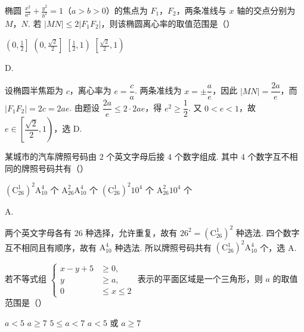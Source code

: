 \begin{problem}
椭圆 \(\frac{x^2}{a^2} + \frac{y^2}{b^2} = 1\)（\(a > b > 0\)）的焦点为 \(F_1\)，\(F_2\)，两条准线与 \(x\) 轴的交点分别为 \(M\)，\(N\). 若 \(|MN| \leqslant 2|F_1F_2|\)，则该椭圆离心率的取值范围是（\quad）

\choices
    {\(\left(0, \frac{1}{2}\right]\)}
    {\(\left(0, \frac{\sqrt{2}}{2}\right]\)}
    {\(\left[\frac{1}{2}, 1\right)\)}
    {\(\left[\frac{\sqrt{2}}{2}, 1\right)\)}
\end{problem}

\begin{answer}
D.
\end{answer}

\begin{solution}
设椭圆半焦距为 \(c\)，离心率为 \(e=\dfrac ca\). 两条准线为 \(x=\pm\dfrac{a}{e}\)，因此
\(|MN|=\dfrac{2a}{e}\)，而 \(|F_1F_2|=2c=2ae\). 由题设
\(\dfrac{2a}{e}\leqslant2\cdot2ae\)，得 \(e^2\geqslant\dfrac12\). 又 \(0<e<1\)，故 \(e\in\left[\dfrac{\sqrt2}{2},1\right)\)，选 D.
\end{solution}

\begin{problem}
某城市的汽车牌照号码由 \(2\) 个英文字母后接 \(4\) 个数字组成. 其中 \(4\) 个数字互不相同的牌照号码共有（\quad）

\choices
    {\(\left(\mathrm C_{26}^{1}\right)^{2}\mathrm A_{10}^{4}\) 个}
    {\(\mathrm A_{26}^{2}\mathrm A_{10}^{4}\) 个}
    {\(\left(\mathrm C_{26}^{1}\right)^{2}10^{4}\) 个}
    {\(\mathrm A_{26}^{2}10^{4}\) 个}
\end{problem}

\begin{answer}
A.
\end{answer}

\begin{solution}
两个英文字母各有 \(26\) 种选择，允许重复，故有 \(26^2=\left(\mathrm C_{26}^{1}\right)^2\) 种选法. 四个数字互不相同且有顺序，故有 \(\mathrm A_{10}^{4}\) 种选法. 所以牌照号码共有 \(\left(\mathrm C_{26}^{1}\right)^2\mathrm A_{10}^{4}\) 个，选 A.
\end{solution}

\begin{problem}
若不等式组 \( \begin{cases}
x-y+5&\geqslant0,\\
y&\geqslant a,\\
0&\leqslant x\leqslant2
\end{cases} \) 表示的平面区域是一个三角形，则 \(a\) 的取值范围是（\quad）

\choices
    {\(a < 5\)}
    {\(a \geqslant 7\)}
    {\(5 \leqslant a < 7\)}
    {\(a < 5\) 或 \(a \geqslant 7\)}
\end{problem}


